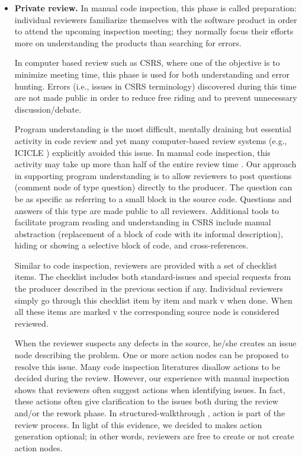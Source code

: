 \begin {itemize}
\item {\bf Private review.}
In manual code inspection, this phase is called
preparation: individual reviewers familiarize themselves with the
software product in order to attend the upcoming inspection
meeting; they normally focus their efforts more on understanding the
products than searching for errors. 

In computer based review such as CSRS, where one of the objective is 
to minimize meeting time, this phase is used for both understanding
and error hunting. Errors (i.e., issues in CSRS terminology)
discovered during  this time are not made public in order to reduce
free riding \cite{Nunamaker91} and to prevent unnecessary discussion/debate.

Program understanding is the most difficult, mentally draining but
essential activity in code review and yet many computer-based review 
systems (e.g., ICICLE \cite{Brothers90} ) explicitly avoided this issue.
In manual code inspection, this activity  may take up more than half of
the entire review time \cite{Humphrey90}.  Our approach in supporting
program understanding is to allow 
reviewers to post questions (comment node of type question) directly
to the producer. The question can be as specific as referring to
a small block in the source code.  Questions and answers of this type
are made public to all reviewers. 
Additional tools to facilitate program reading and understanding in
CSRS include manual abstraction (replacement of a block of code with
its informal description),  hiding or showing a selective block of
code, and cross-references. 

Similar to code inspection, reviewers are provided with a set of
checklist items. The checklist includes both standard-issues and
special requests from the producer described in the
previous section if any.
Individual reviewers simply
go through this checklist item by item and mark v when done. When all
these items are marked v  the corresponding source node is
considered reviewed. 

When the reviewer suspects any defects in the source, he/she creates
an issue node describing the problem. One or more action nodes can be
proposed to 
resolve this issue. Many code inspection literatures
\cite{Fagan76,Humphrey90} disallow actions to be decided during the review.
However, our experience with manual
inspection shows that reviewers often suggest actions when identifying
issues. In fact, these actions often give clarification to the issues
both during the review and/or the rework phase. In
structured-walkthrough \cite{Yourdon79}, action is part of the review process.
In light of this evidence, we decided to 
makes action generation optional; in other words, reviewers are free to
create or not create action nodes. 


\end{itemize}
